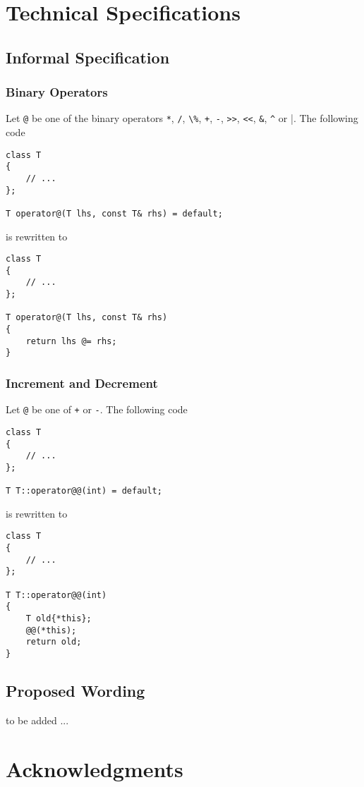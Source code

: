 \documentclass[a4paper,11pt,twoside,final]{article}
\numberwithin{equation}{subsection}
\begin{document}
\section{Technical Specifications}
\subsection{Informal Specification}
\subsubsection{Binary Operators}
Let \verb|@| be one of the binary operators \verb|*|, \verb|/|, \verb|\%|, \verb|+|, \verb|-|, \verb|>>|, \verb|<<|, \verb|&|, \verb|^| or \verb|||. The following code
\begin{verbatim}
class T
{
    // ...
};

T operator@(T lhs, const T& rhs) = default;
\end{verbatim}
is rewritten to 
\begin{verbatim}
class T
{
    // ...
};

T operator@(T lhs, const T& rhs)
{
    return lhs @= rhs;
}
\end{verbatim}

\subsubsection{Increment and Decrement}
Let \verb|@| be one of \verb|+| or \verb|-|. 
The following code
\begin{verbatim}
class T
{
    // ...
};

T T::operator@@(int) = default;
\end{verbatim}
is rewritten to 
\begin{verbatim}
class T
{
    // ...
};

T T::operator@@(int)
{
    T old{*this};
    @@(*this);
    return old;
}
\end{verbatim}

\subsection{Proposed Wording}
to be added ...

\section{Acknowledgments}



\end{document}
